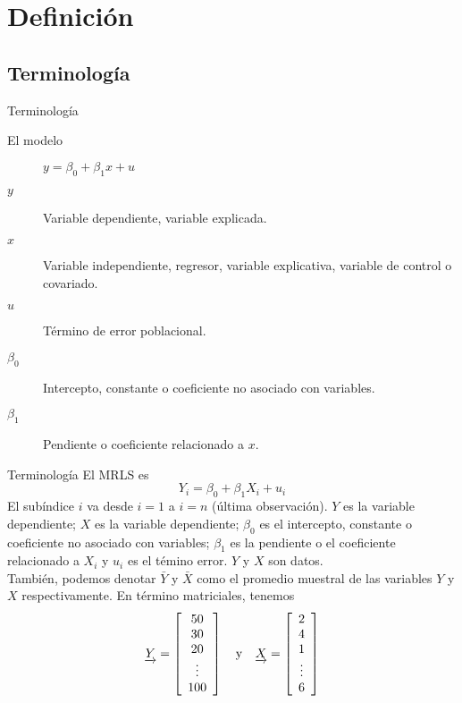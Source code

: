 \section{Definición}

\subsection{Terminología}
\begin{frame}{Terminología}
	\begin{description}
		\item[El modelo] $y=\beta_{0}+\beta_{1}x+u$
		\pause
		\item[$y$] Variable dependiente, variable explicada.
		\pause
		\item[$x$] Variable independiente, regresor, variable explicativa, variable de control o covariado.
		\pause
		\item[$u$] Término de error poblacional.
		\pause
		\item[$\beta_{0}$] Intercepto, constante o coeficiente no asociado con variables.
		\pause
		\item[$\beta_{1}$] Pendiente o coeficiente relacionado a $x$.
	\end{description}
\end{frame}
\begin{frame}{Terminología}
	El MRLS es {\large $$ Y_{i} = \beta_{0} + \beta_{1}X_{i}+u_{i}$$}El subíndice $i$ va desde $i = 1$ a $i = n$ (última observación). $Y$ es la variable dependiente; $X$ es la variable dependiente; $\beta_{0}$ es el intercepto, constante o coeficiente no asociado con variables; $\beta_{1}$ es la pendiente o el coeficiente relacionado a $X_{i}$ y $u_{i}$ es el témino error. $Y$ y $X$ son datos.\\

	También, podemos denotar $\bar{Y}$ y $\bar{X}$ como el promedio muestral de las variables $Y$ y $X$ respectivamente. En término matriciales, tenemos
		$$ \underrightarrow{Y} = \left [ \begin{array}{c}
											50		\\
											30		\\
											20		\\
											\vdots	\\
											100
										 \end{array}
								 \right] 
		\quad \textup{y} \quad
			\underrightarrow{X} = \left [ \begin{array}{c}
											2		\\
											4		\\
											1		\\
											\vdots	\\
											6
										 \end{array}
								  \right]$$
\end{frame}

